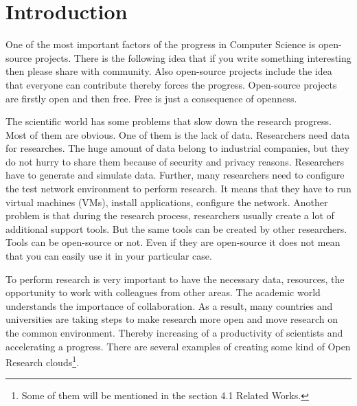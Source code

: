 \section{Introduction}

One of the most important factors of the progress in Computer Science is open-source projects. There is the following idea that if you write something interesting then please share with community. Also open-source projects include the idea that everyone can contribute thereby forces the progress. Open-source projects are firstly open and then free. Free is just a consequence of openness.

The scientific world has some problems that slow down the research progress. Most of them are obvious. One of them is the lack of data. Researchers need data for researches. The huge amount of data belong to industrial companies, but they do not hurry to share them because of security and privacy reasons. Researchers have to generate and simulate data. Further, many researchers need to configure the test network environment to perform research. It means that they have to run virtual machines (VMs), install applications, configure the network. Another problem is that during the research process, researchers usually create a lot of additional support tools. But the same tools can be created by other researchers. Tools can be open-source or not. Even if they are open-source it does not mean that you can easily use it in your particular case.  
 
To perform research is very important to have the necessary data, resources, the opportunity to work with colleagues from other areas. The academic world understands the importance of collaboration. As a result, many countries and universities are taking steps to make research more open and move research on the common environment. Thereby increasing of a productivity of scientists and accelerating a progress. There are several examples of creating some kind of Open Research clouds\footnote{Some of them will be mentioned in the section 4.1 Related Works.}.

